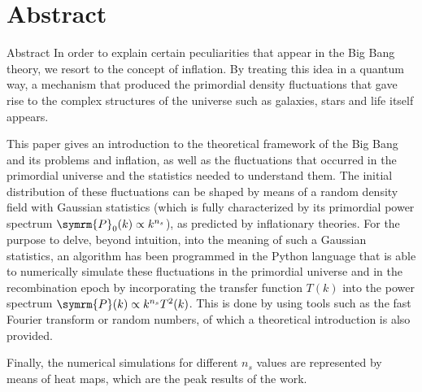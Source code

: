 \section{Abstract}
\begin{frame}{Abstract}
    \scriptsize In order to explain certain peculiarities that appear in the Big Bang theory, we resort to the concept of inflation. By treating this idea in a quantum way, a mechanism that produced the primordial density fluctuations that gave rise to the complex structures of the universe such as galaxies, stars and life itself appears.

    This paper gives an introduction to the theoretical framework of the Big Bang and its problems and inflation, as well as the fluctuations that occurred in the primordial universe and the statistics needed to understand them. The initial distribution of these fluctuations can be shaped by means of a random density field with Gaussian statistics (which is fully characterized by its primordial power spectrum \(\symrm{P}_0(k)\propto k^{n_s}\)), as predicted by inflationary theories. For the purpose to delve, beyond intuition, into the meaning of such a Gaussian statistics, an algorithm has been programmed in the Python language that is able to numerically simulate these fluctuations in the primordial universe and in the recombination epoch by incorporating the transfer function \(T(k)\) into the power spectrum \(\symrm{P}(k)\propto k^{n_s}T^2(k)\). This is done by using tools such as the fast Fourier transform or random numbers, of which a theoretical introduction is also provided.
    
    Finally, the numerical simulations for different \(n_s\) values are represented by means of heat maps, which are the peak results of the work.
\end{frame}